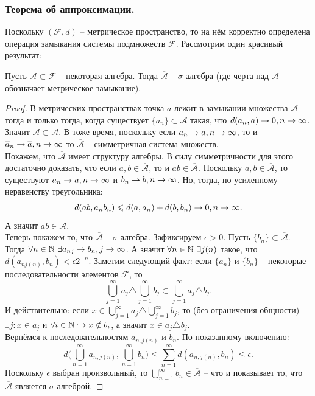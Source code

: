 \subsubsection{Теорема об аппроксимации.}
Поскольку $(\mathcal{F}, d)$ -- метрическое пространство, то на нём корректно определена операция замыкания системы подмножеств $\mathcal{F}$. Рассмотрим один красивый результат:
\begin{theorem}[об аппроксимации]
    Пусть $\mathcal{A} \subset \mathcal{F}$ -- некоторая алгебра. Тогда $\overline{\mathcal{A}}$ -- $\sigma$-алгебра (где черта над $\mathcal{A}$ обозначает метрическое замыкание).
\end{theorem}
\begin{proof}
    В метрических пространствах точка $a$ лежит в замыкании множества $\mathcal{A}$ тогда и только тогда, когда существует $\{a_n\} \subset \mathcal{A}$ такая, что $d(a_n, a) \rightarrow 0, n \rightarrow \infty$. \\
    Значит $\mathcal{A} \subset \overline{\mathcal{A}}$. В тоже время, поскольку если $a_n \rightarrow a, n \rightarrow \infty$, то и $\overline{a}_n \rightarrow \overline{a}, n \rightarrow \infty$ то $\overline{\mathcal{A}}$ -- симметричная система множеств. \\
    Покажем, что $\overline{\mathcal{A}}$ имеет структуру алгебры. В силу симметричности для этого достаточно доказать, что если $a, b \in \overline{\mathcal{A}}$, то и $ab \in \overline{\mathcal{A}}$. Поскольку $a, b \in \overline{\mathcal{A}}$, то существуют $a_n \rightarrow a, n \rightarrow \infty$ и $b_n \rightarrow b, n \rightarrow \infty$. Но, тогда, по усиленному неравенству треугольника:
    \[
        d(ab, a_nb_n) \leqslant d(a, a_n) + d(b, b_n) \rightarrow 0, n \rightarrow \infty.
    \]
    А значит $ab \in \mathcal{\overline{A}}$. \\
    Теперь покажем то, что $\overline{\mathcal{A}}$ -- $\sigma$-алгебра. Зафиксируем $\epsilon > 0$.
    Пусть $\{b_n\} \subset \overline{\mathcal{A}}$. Тогда $\forall n \in \mathbb{N} \ \exists a_{nj} \rightarrow b_n, j \rightarrow \infty$. А значит $\forall n \in \mathbb{N} \ \exists j(n)$ такое, что $d(a_{nj(n)}, b_n) < \epsilon2^{-n}$. Заметим следующий факт: если $\{a_n\}$ и $\{b_n\}$ -- некоторые последовательности элементов $\mathcal{F}$, то
    \[
        \bigcup\limits_{j = 1}^\infty a_j \triangle \bigcup\limits_{j = 1}^\infty b_j \subset \bigcup\limits_{j = 1}^{\infty} a_j \triangle b_j.
    \]
    И действительно: если $x \in \bigcup\limits_{j = 1}^\infty a_j \triangle \bigcup\limits_{j = 1}^\infty b_j$, то (без ограничения общности) $\exists j: x \in a_j$ и $\forall i \in \mathbb{N} \hookrightarrow x \notin b_i$, а значит $x \in a_j \triangle b_j$. \\
    Вернёмся к последовательностям $a_{n, j(n)}$ и $b_n$. По показанному включению:
    \[
        d\biggr(\bigcup_{n = 1}^\infty a_{n, j(n)}, \bigcup_{n = 1}^\infty b_{n}\biggr) \leq \sum\limits_{n = 1}^\infty d(a_{n, j(n)}, b_n) \leq \epsilon.
    \]
    Поскольку $\epsilon$ выбран произвольный, то $\bigcup\limits_{n = 1}^{\infty} b_n \in \overline{\mathcal{A}}$ -- что и показывает то, что $\overline{\mathcal{A}}$ является $\sigma$-алгеброй.
\end{proof}
